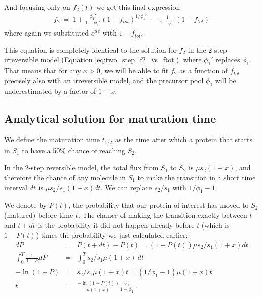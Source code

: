 \documentclass{article}
\begin{document}
And focusing only on $f_2(t)$ we get this final expression
\begin{eqnarray}
    f_2 ~=~ 1 + \frac{\phi_1'}{1 - \phi_1'} (1-f_{tot})^{1/\phi_1'} ~-~ \frac{1}{1 - \phi_1'} (1-f_{tot})
\end{eqnarray}
where again we substituted $e^{\mu\,t}$ with $1-f_{tot}$.

This equation is completely identical to the solution for $f_2$ in the 2-step irreversible model (Equation \ref{eq:two_step_f2_vs_ftot}), where $\phi_1'$ replaces $\phi_1$. That means that for any $x > 0$, we will be able to fit $f_2$ as a function of $f_{tot}$ precisely also with an irreversible model, and the precursor pool $\phi_1$ will be underestimated by a factor of $1+x$.

\subsection{Analytical solution for maturation time}
We define the maturation time $t_{1/2}$ as the time after which a protein that starts in $S_1$ to have a 50\% chance of reaching $S_2$. 

In the 2-step reversible model, the total flux from $S_1$ to $S_2$ is $\mu s_2 (1+x)$, and therefore the chance of any molecule in $S_1$ to make the transition in a short time interval $dt$ is $\mu s_2/s_1 (1+x) dt$. We can replace $s_2/s_1$ with $1/\phi_1 - 1$.

We denote by $P(t)$, the probability that our protein of interest has moved to $S_2$ (matured) before time $t$. The chance of making the transition exactly between $t$ and $t+dt$ is the probability it did not happen already before $t$ (which is $1 - P(t)$) times the probability we just calculated earlier:
\begin{eqnarray}
    dP &=& P(t + dt) - P(t) = \left(1 - P(t)\right) \mu s_2/s_1 (1+x) dt \\
    \int_0^T \frac{1}{1-P} dP &=& \int_0^T s_2/s_1 \mu (1+x)~dt  \\
    -\ln(1-P) &=& s_2/s_1 \mu (1+x)t = (1/\phi_1 - 1)\mu (1+x)t  \\
    t &=& \frac{-\ln(1-P(t))}{\mu (1+x)} \frac{\phi_1}{1 - \phi_1}\,.
\end{eqnarray}
\end{document}
